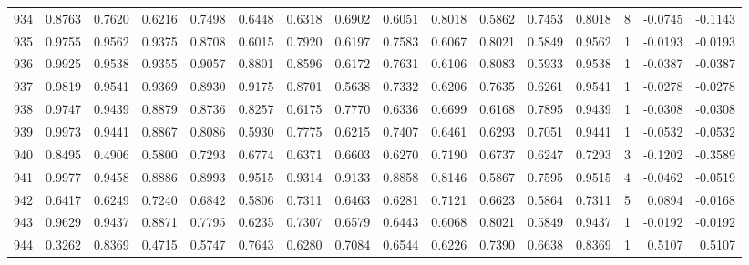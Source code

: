 \begin{tabular}{lrrrrrrrrrrrrrrr}
934 &      0.8763 &  0.7620 &  0.6216 &  0.7498 &  0.6448 &  0.6318 &  0.6902 &  0.6051 &  0.8018 &  0.5862 &   0.7453 &     0.8018 &      8 &                   -0.0745 &                    -0.1143 \\
935 &      0.9755 &  0.9562 &  0.9375 &  0.8708 &  0.6015 &  0.7920 &  0.6197 &  0.7583 &  0.6067 &  0.8021 &   0.5849 &     0.9562 &      1 &                   -0.0193 &                    -0.0193 \\
936 &      0.9925 &  0.9538 &  0.9355 &  0.9057 &  0.8801 &  0.8596 &  0.6172 &  0.7631 &  0.6106 &  0.8083 &   0.5933 &     0.9538 &      1 &                   -0.0387 &                    -0.0387 \\
937 &      0.9819 &  0.9541 &  0.9369 &  0.8930 &  0.9175 &  0.8701 &  0.5638 &  0.7332 &  0.6206 &  0.7635 &   0.6261 &     0.9541 &      1 &                   -0.0278 &                    -0.0278 \\
938 &      0.9747 &  0.9439 &  0.8879 &  0.8736 &  0.8257 &  0.6175 &  0.7770 &  0.6336 &  0.6699 &  0.6168 &   0.7895 &     0.9439 &      1 &                   -0.0308 &                    -0.0308 \\
939 &      0.9973 &  0.9441 &  0.8867 &  0.8086 &  0.5930 &  0.7775 &  0.6215 &  0.7407 &  0.6461 &  0.6293 &   0.7051 &     0.9441 &      1 &                   -0.0532 &                    -0.0532 \\
940 &      0.8495 &  0.4906 &  0.5800 &  0.7293 &  0.6774 &  0.6371 &  0.6603 &  0.6270 &  0.7190 &  0.6737 &   0.6247 &     0.7293 &      3 &                   -0.1202 &                    -0.3589 \\
941 &      0.9977 &  0.9458 &  0.8886 &  0.8993 &  0.9515 &  0.9314 &  0.9133 &  0.8858 &  0.8146 &  0.5867 &   0.7595 &     0.9515 &      4 &                   -0.0462 &                    -0.0519 \\
942 &      0.6417 &  0.6249 &  0.7240 &  0.6842 &  0.5806 &  0.7311 &  0.6463 &  0.6281 &  0.7121 &  0.6623 &   0.5864 &     0.7311 &      5 &                    0.0894 &                    -0.0168 \\
943 &      0.9629 &  0.9437 &  0.8871 &  0.7795 &  0.6235 &  0.7307 &  0.6579 &  0.6443 &  0.6068 &  0.8021 &   0.5849 &     0.9437 &      1 &                   -0.0192 &                    -0.0192 \\
944 &      0.3262 &  0.8369 &  0.4715 &  0.5747 &  0.7643 &  0.6280 &  0.7084 &  0.6544 &  0.6226 &  0.7390 &   0.6638 &     0.8369 &      1 &                    0.5107 &                     0.5107 \\

\end{tabular}
